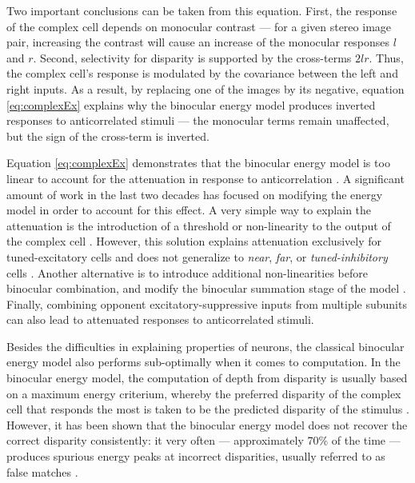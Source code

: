 Two important conclusions can be taken from this equation. First, the response of the complex cell depends on monocular contrast --- for a given stereo image pair, increasing the contrast will cause an increase of the monocular responses $l$ and $r$. Second, selectivity for disparity is supported by the cross-terms $2lr$. Thus, the complex cell's response is modulated by the covariance between the left and right inputs. As a result, by replacing one of the images by its negative, equation \ref{eq:complexEx} explains why the binocular energy model produces inverted responses to anticorrelated stimuli --- the monocular terms remain unaffected, but the sign of the cross-term is inverted.

Equation \ref{eq:complexEx} demonstrates that the binocular energy model is too linear to account for the attenuation in response to anticorrelation \cite{Cumming:1997ve}. A significant amount of work in the last two decades has focused on modifying the energy model in order to account for this effect. A very simple way to explain the attenuation is the introduction of a threshold or non-linearity to the output of the complex cell \cite{Lippert:2001fk, Read:2002kx}. However, this solution explains attenuation exclusively for tuned-excitatory cells and does not generalize to \textit{near}, \textit{far}, or \textit{tuned-inhibitory} cells \cite{Read:2002kx}. Another alternative is to introduce additional non-linearities before binocular combination, and modify the binocular summation stage of the model \cite{Read:2002kx,Read:2003ij}. Finally, combining opponent excitatory-suppressive inputs from multiple subunits \cite{Haefner:2008jg, Tanabe:2008lo} can also lead to attenuated responses to anticorrelated stimuli.

Besides the difficulties in explaining properties of neurons, the classical binocular energy model also performs sub-optimally when it comes to computation. In the binocular energy model, the computation of depth from disparity is usually based on a maximum energy criterium, whereby the preferred disparity of the complex cell that responds the most is taken to be the predicted disparity of the stimulus \cite{Qian:1997bu,Qian:1994:CSD:1362347.1362350,Read:2002kx}. However, it has been shown that the binocular energy model does not recover the correct disparity consistently: it very often --- approximately 70\% of the time \cite{Read:2007nx} --- produces spurious energy peaks at incorrect disparities, usually referred to as false matches \cite{Fleet:1996tq,Read:2007nx}.

